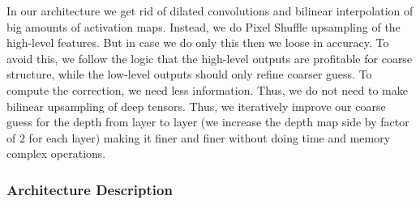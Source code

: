 \documentclass[10pt,twocolumn,letterpaper]{article}
\begin{document}
In our architecture we get rid of dilated convolutions and bilinear interpolation of
big amounts of activation maps. Instead, we do Pixel Shuffle upsampling of the high-level features.
But in case we do only this then we loose in accuracy. To avoid this, we follow the logic
that the high-level outputs are profitable for coarse structure, while the low-level outputs
should only refine coarser guess. To compute the correction, we need less information. Thus, we do
not need to make bilinear upsampling of deep tensors. Thus, we iteratively improve our coarse guess
for the depth from layer to layer (we increase the depth map side by factor of $2$ for each layer) 
making it finer and finer without doing time and memory complex operations.

\subsubsection{Architecture Description}
\end{document}
